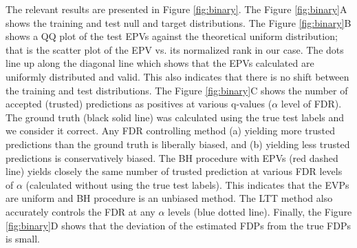 \documentclass{article}
\begin{document}
The relevant results are presented in Figure \ref{fig:binary}. The Figure \ref{fig:binary}A shows the training and test null and target distributions. %
The Figure \ref{fig:binary}B shows a QQ plot of the test EPVs against the theoretical uniform distribution; that is the scatter plot of the EPV vs. its normalized rank in our case. The dots line up along the diagonal line which shows that the EPVs calculated are uniformly distributed and valid. This also indicates that there is no shift between the training and test distributions. %
The Figure \ref{fig:binary}C shows the number of accepted (trusted) predictions as positives at various q-values ($\alpha$ level of FDR). The ground truth (black solid line) was calculated using the true test labels and we consider it correct. Any FDR controlling method (a) yielding more trusted predictions than the ground truth is liberally biased, and (b) yielding less trusted predictions is conservatively biased. The BH procedure with EPVs (red dashed line) yields closely the same number of trusted prediction at various FDR levels of $\alpha$ (calculated without using the true test labels). This indicates that the EVPs are uniform and BH procedure is an unbiased method. The LTT method also accurately controls the FDR at any $\alpha$ levels (blue dotted line). Finally, the Figure \ref{fig:binary}D shows that the deviation of the estimated FDPs from the true FDPs is small.
\end{document}
